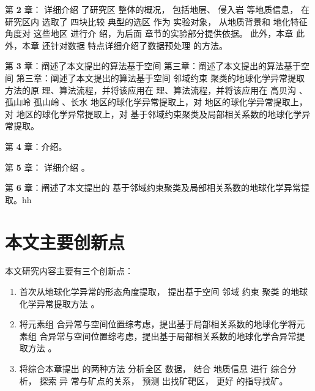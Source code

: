 第 \textbf{2} 章： 详细介绍 了研究区 整体的概况， 包括地层、 侵入岩 等地质信息， 在研究区内 选取了 四块比较 典型的选区 作为 实验对象， 从地质背景和 地化特征 角度对 这些地区 进行介 绍，为后面 章节的实验部分提供依据。 此外，本章 此外，本章 还针对数据 特点详细介绍了数据预处理 的方法。

第 \textbf{3} 章：阐述了本文提出的算法基于空间 第三章：阐述了本文提出的算法基于空间 第三章：阐述了本文提出的算法基于空间 邻域约束 聚类的地球化学异常提取 方法的原 理、算法流程，并将该应用在 理、算法流程，并将该应用在 高贝沟 、孤山岭 孤山岭 、长水 地区的球化学异常提取上，对 地区的球化学异常提取上，对 地区的球化学异常提取上，对
基于邻域约束聚类及局部相关系数的地球化学异常提取。

第 \textbf{4} 章：介绍。

第 \textbf{5} 章： 详细介绍 。

第 \textbf{6} 章：阐述了本文提出的
基于邻域约束聚类及局部相关系数的地球化学异常提取。hh


\section{本文主要创新点}
\label{sec:forth}
本文研究内容主要有三个创新点：
\begin{enumerate}[(1)]
    \item 首次从地球化学异常的形态角度提取， 提出基于空间 邻域 约束 聚类 的地球化学异常提取方法 。
    \item 将元素组 合异常与空间位置综考虑，提出基于局部相关系数的地球化学将元素组 合异常与空间位置综考虑，提出基于局部相关系数的地球化学合异常提取方法 。
    \item 将综合本章提出 的两种方法 分析全区 数据， 结合 地质信息 进行 综合分析， 探索 异 常与矿点的关系， 预测 出找矿靶区， 更好 的指导找矿。

\end{enumerate}

